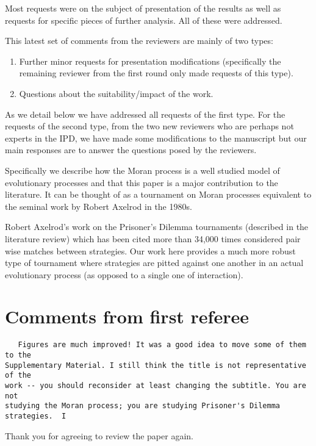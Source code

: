 \documentclass[a4]{article}
\begin{document}
Most requests were on the subject of
presentation of the results as well as requests for specific pieces of further
analysis. All of these were addressed.

This latest set of comments from the reviewers are mainly of two types:

\begin{enumerate}
    \item Further minor requests for presentation modifications (specifically
        the remaining reviewer from the first round only made requests of this
        type).
    \item Questions about the suitability/impact of the work.
\end{enumerate}

As we detail below we have addressed all requests of the first type. For the
requests of the second type, from the two new reviewers who are perhaps not
experts in the IPD, we have made some modifications to the manuscript but our
main responses are to answer the questions posed by the reviewers.

Specifically we describe how the Moran process is a well studied model of
evolutionary processes and that this paper is a major contribution to the
literature. It can be thought of as a tournament on Moran processes equivalent
to the seminal work by Robert Axelrod in the 1980s.

Robert Axelrod's work on the Prisoner's Dilemma tournaments (described in
the literature review) which has been cited more than 34,000 times considered
pair wise matches between strategies. Our work here provides a much more robust
type of tournament where strategies are pitted against one another in an actual
evolutionary process (as opposed to a single one of interaction).

\section{Comments from first referee}

\begin{verbatim}
   Figures are much improved! It was a good idea to move some of them to the
Supplementary Material. I still think the title is not representative of the
work -- you should reconsider at least changing the subtitle. You are not
studying the Moran process; you are studying Prisoner's Dilemma strategies.  I
\end{verbatim}

Thank you for agreeing to review the paper again.
\end{document}
